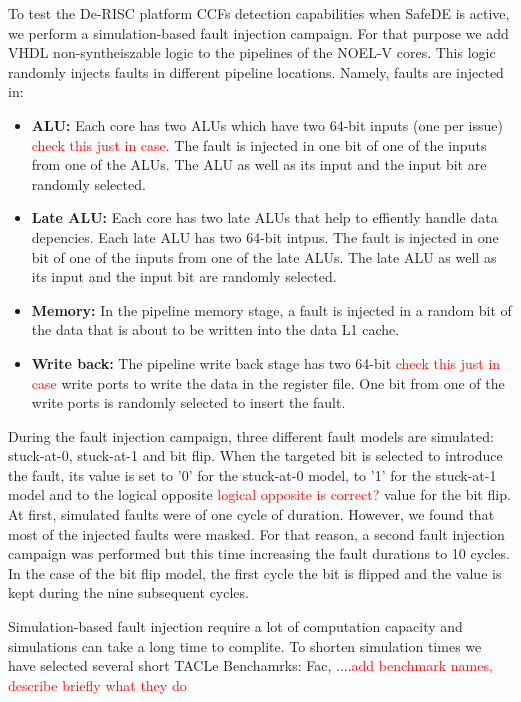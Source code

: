 To test the De-RISC platform CCFs detection capabilities when SafeDE is active, we perform a simulation-based fault injection campaign. For that purpose we add VHDL non-syntheiszable logic to the pipelines of the NOEL-V cores. This logic randomly injects faults in different pipeline locations. Namely, faults are injected in:

\begin{itemize}
    \item \textbf{ALU:} Each core has two ALUs which have two 64-bit inputs (one per issue) \textcolor{red}{check this just in case}. The fault is injected in one bit of one of the inputs from one of the ALUs. The ALU as well as its input and the input bit are randomly selected. 
    \item \textbf{Late ALU:} Each core has two late ALUs that help to effiently handle data depencies. Each late ALU has two 64-bit intpus. The fault is injected in one bit of one of the inputs from one of the late ALUs. The late ALU as well as its input and the input bit are randomly selected.
    \item \textbf{Memory:} In the pipeline memory stage, a fault is injected in a random bit of the data that is about to be written into the data L1 cache.
    \item \textbf{Write back:} The pipeline write back stage has two 64-bit \textcolor{red}{check this just in case} write ports to write the data in the register file. One bit from one of the write ports is randomly selected to insert the fault.
\end{itemize}

During the fault injection campaign, three different fault models are simulated: stuck-at-0, stuck-at-1 and bit flip. When the targeted bit is selected to introduce the fault, its value is set to '0' for the stuck-at-0 model, to '1' for the stuck-at-1 model and to the logical opposite \textcolor{red}{logical opposite is correct?} value for the bit flip. At first, simulated faults were of one cycle of duration. However, we found that most of the injected faults were masked. For that reason, a second fault injection campaign was performed but this time increasing the fault durations to 10 cycles. In the case of the bit flip model, the first cycle the bit is flipped and the value is kept during the nine subsequent cycles.

Simulation-based fault injection require a lot of computation capacity and simulations can take a long time to complite. To shorten simulation times we have selected several short TACLe Benchamrks: Fac, ....\textcolor{red}{add benchmark names, describe briefly what they do}

